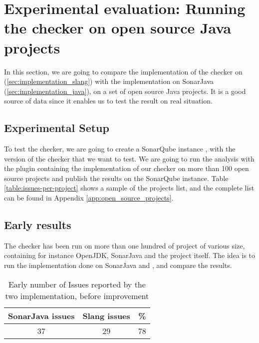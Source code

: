 \section{Experimental evaluation: \newline Running the checker on open source Java projects}
\label{sec:running_checker}

In this section, we are going to compare the implementation of the checker on \slang{}(\ref{sec:implementation_slang}) with the implementation on SonarJava (\ref{sec:implementation_java}), on a set of open source Java projects. It is a good source of data since it enables us to test the result on real situation.

\subsection{Experimental Setup}
\label{subsec:experimental_setup}

To test the checker, we are going to create a SonarQube instance \cite{SonarQube:2019:Online}, with the version of the checker that we want to test. We are going to run the analysis with the plugin containing the implementation of our checker on more than 100 open source projects and publish the results on the SonarQube instance. Table \ref{table:issues-per-project} shows a sample of the projects list, and the complete list can be found in Appendix \ref{app:open_source_projects}.

\subsection{Early results}
\label{subsec:early_results}

The checker has been run on more than one hundred of project of various size, containing for instance OpenJDK, SonarJava and the \slang{} project itself. 
The idea is to run the implementation done on SonarJava and \slang, and compare the results.

\begin{table}[h]
	\centering
	\caption{Early number of Issues reported by the two implementation, before improvement}
	\label{table:early-sonarjava-vs-slang}
	\begin{tabular}{|c|c|c|}
		\hline
		\bf SonarJava issues & \bf Slang issues & \bf \% \\ \hline
		37 &  29 &  78 \\ \hline
	\end{tabular}
\end{table}



